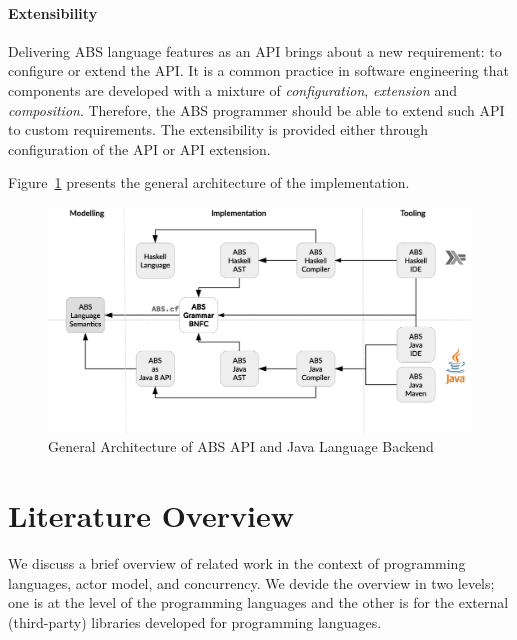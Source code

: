 
\paragraph{Extensibility}
Delivering ABS language features as an API brings about a new requirement: to configure or extend the API. 
It is a common practice in software engineering that components are developed with a mixture of \emph{configuration}, \emph{extension} and \emph{composition}.
Therefore, the ABS programmer should be able to extend such API to custom requirements. 
The extensibility is provided either through configuration of the API or API extension.

Figure~\ref{fig:arch} presents the general architecture of the implementation.

\begin{figure}[h]
\centering
\includegraphics[scale=0.3]{../figs/Arch.eps}
\caption[General Architecture]{General Architecture of ABS API and Java Language Backend}
\label{fig:arch}
\end{figure}

\section{Literature Overview}
\label{sec:intro:rel}

We discuss a brief overview of related work in the context of programming languages, actor model, and concurrency.
We devide the overview in two levels; one is at the level of the programming languages and the other is for the external (third-party) libraries developed for programming languages.

